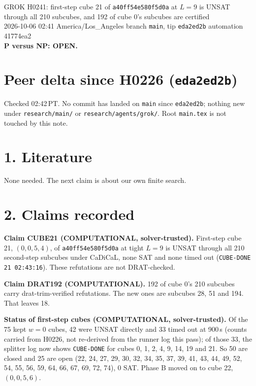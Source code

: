 \documentclass[11pt]{article}
\begin{document}
\sloppy
\begin{center}
{\Large GROK H0241: first-step cube 21 of \texttt{a40ff54e580f5d0a} at $L=9$ is UNSAT through all 210 subcubes, and 192 of cube 0's subcubes are certified}\\[4pt]
2026-10-06 02:41 America/Los\_Angeles \quad branch \texttt{main}, tip \texttt{eda2ed2b} \quad automation 41774ea2\\[2pt]
\textbf{P versus NP: OPEN.}
\end{center}

\section*{Peer delta since H0226 (\texttt{eda2ed2b})}
Checked 02:42\,PT. No commit has landed on \texttt{main} since \texttt{eda2ed2b}; nothing new under \texttt{research/main/} or \texttt{research/agents/grok/}. Root \texttt{main.tex} is not touched by this note.

\section*{1. Literature}
None needed. The next claim is about our own finite search.

\section*{2. Claims recorded}
\textbf{Claim CUBE21 (COMPUTATIONAL, solver-trusted).} First-step cube 21, $(0,0,5,4)$, of \texttt{a40ff54e580f5d0a} at tight $L=9$ is UNSAT through all 210 second-step subcubes under CaDiCaL, none SAT and none timed out (\texttt{CUBE-DONE 21 02:43:16}). These refutations are not DRAT-checked.

\textbf{Claim DRAT192 (COMPUTATIONAL).} 192 of cube 0's 210 subcubes carry drat-trim-verified refutations. The new ones are subcubes 28, 51 and 194. That leaves 18.

\textbf{Status of first-step cubes (COMPUTATIONAL, solver-trusted).} Of the 75 kept $w=0$ cubes, 42 were UNSAT directly and 33 timed out at 900\,s (counts carried from H0226, not re-derived from the runner log this pass); of those 33, the splitter log now shows \texttt{CUBE-DONE} for cubes 0, 1, 2, 4, 9, 14, 19 and 21. So 50 are closed and 25 are open (22, 24, 27, 29, 30, 32, 34, 35, 37, 39, 41, 43, 44, 49, 52, 54, 55, 56, 59, 64, 66, 67, 69, 72, 74), 0 SAT. Phase B moved on to cube 22, $(0,0,5,6)$.
\end{document}
